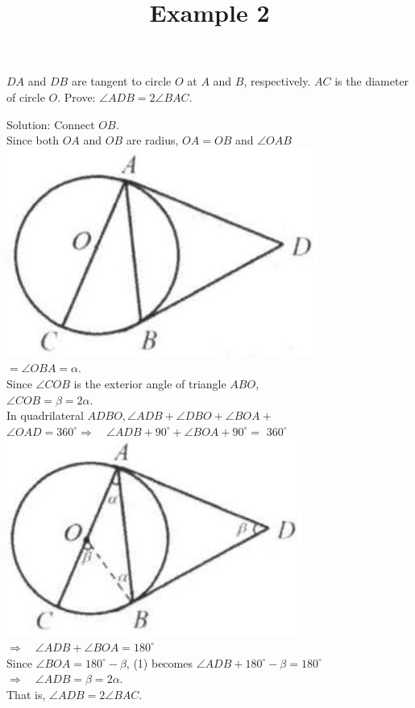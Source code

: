 \documentclass{article}
\title{Example 2}
\date{}
\begin{document}
\maketitle

\(D A\) and \(D B\) are tangent to circle \(O\) at \(A\) and \(B\), respectively. \(A C\) is the diameter of circle \(O\). Prove: \(\angle A D B=2 \angle B A C\).

Solution:
Connect \(O B\).\\
Since both \(O A\) and \(O B\) are radius, \(O A=O B\) and \(\angle O A B\)\\
\centering
\includegraphics[width=\textwidth]{images/problem_image_1.jpg}\\
\(=\angle O B A=\alpha\).\\
Since \(\angle C O B\) is the exterior angle of triangle \(A B O\),\\
\(\angle C O B=\beta=2 \alpha\).\\
In quadrilateral \(A D B O, \angle A D B+\angle D B O+\angle B O A+\) \(\angle O A D=360^{\circ} \Rightarrow \quad \angle A D B+90^{\circ}+\angle B O A+90^{\circ}=\) \(360^{\circ}\)\\
\centering
\includegraphics[width=\textwidth]{images/reasoning_image_1.jpg}\\
\(\Rightarrow \quad \angle A D B+\angle B O A=180^{\circ}\)\\
Since \(\angle B O A=180^{\circ}-\beta\), (1) becomes \(\angle A D B+180^{\circ}-\beta=180^{\circ}\)\\
\(\Rightarrow \quad \angle A D B=\beta=2 \alpha\).\\
That is, \(\angle A D B=2 \angle B A C\).
\end{document}
